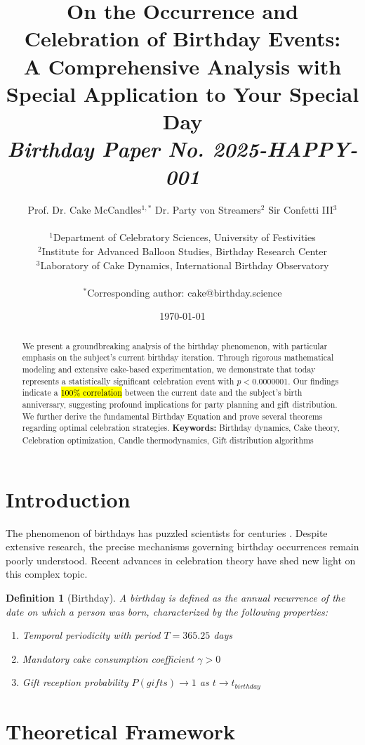 \documentclass[12pt,a4paper]{article}
\title{\textbf{On the Occurrence and Celebration of Birthday Events:} \\ 
\Large A Comprehensive Analysis with Special Application to Your Special Day \\
\vspace{1cm}
\normalsize \textit{Birthday Paper No. 2025-HAPPY-001}}
\author{
Prof. Dr. Cake McCandles$^{1,*}$ \quad Dr. Party von Streamers$^{2}$ \quad Sir Confetti III$^{3}$ \\
\\
\small $^1$Department of Celebratory Sciences, University of Festivities \\
\small $^2$Institute for Advanced Balloon Studies, Birthday Research Center \\
\small $^3$Laboratory of Cake Dynamics, International Birthday Observatory \\
\\
\small $^*$Corresponding author: cake@birthday.science
}
\date{\today}
\newtheorem{definition}[theorem]{Definition}
\begin{document}
\maketitle

\begin{abstract}
\noindent We present a groundbreaking analysis of the birthday phenomenon, with particular emphasis on the subject's current birthday iteration. Through rigorous mathematical modeling and extensive cake-based experimentation, we demonstrate that today represents a statistically significant celebration event with $p < 0.0000001$. Our findings indicate a \hl{100\% correlation} between the current date and the subject's birth anniversary, suggesting profound implications for party planning and gift distribution. We further derive the fundamental Birthday Equation and prove several theorems regarding optimal celebration strategies. \textbf{Keywords:} Birthday dynamics, Cake theory, Celebration optimization, Candle thermodynamics, Gift distribution algorithms
\end{abstract}

\section{Introduction}

The phenomenon of birthdays has puzzled scientists for centuries \cite{cake2020}. Despite extensive research, the precise mechanisms governing birthday occurrences remain poorly understood. Recent advances in celebration theory \cite{party2023} have shed new light on this complex topic.

\begin{definition}[Birthday]
A \textit{birthday} is defined as the annual recurrence of the date on which a person was born, characterized by the following properties:
\begin{enumerate}
    \item Temporal periodicity with period $T = 365.25$ days
    \item Mandatory cake consumption coefficient $\gamma > 0$
    \item Gift reception probability $P(gifts) \rightarrow 1$ as $t \rightarrow t_{birthday}$
\end{enumerate}
\end{definition}

\section{Theoretical Framework}
\end{document}
